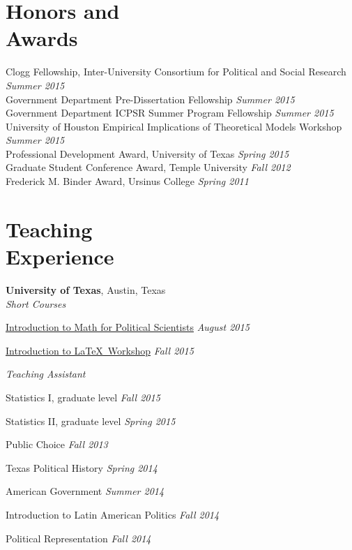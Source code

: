 \documentclass[margin,line]{res}
\newenvironment{list2}{
    \begin{list}{--}{%
        \setlength{\itemsep}{0in}
        \setlength{\parsep}{0in} \setlength{\parskip}{0in}
        \setlength{\topsep}{0in} \setlength{\partopsep}{0in}
        \setlength{\leftmargin}{0.2in}}}{\end{list}}
\begin{document}
\begin{resume}
\section{\sc Honors and \\Awards}
Clogg Fellowship, Inter-University Consortium for Political and Social Research \hfill {\em Summer 2015} \\
Government Department Pre-Dissertation Fellowship   \hfill {\em Summer 2015} \\
Government Department ICPSR Summer Program Fellowship     \hfill    {\em Summer 2015} \\
University of Houston Empirical Implications of Theoretical Models Workshop  \hfill    {\em Summer 2015} \\
Professional Development Award, University of Texas \hfill    {\em Spring 2015} \\
Graduate Student Conference Award, Temple University \hfill    {\em Fall 2012} \\
Frederick M. Binder Award, Ursinus College \hfill    {\em Spring 2011} %

\section{\sc Teaching \\Experience}
\textbf{University of Texas}, Austin, Texas  \\
\emph{Short Courses}
\begin{list2}
	\item
          \href{https://github.com/jabranham/math-camp}{Introduction
            to Math for Political Scientists} \hfill \emph{August
            2015}
        \item
          \href{https://github.com/jabranham/latex-workshop}{Introduction
            to \LaTeX~Workshop} \hfill \emph{Fall 2015}
\end{list2}
\emph{Teaching Assistant} 

\begin{list2}
    \item Statistics I, graduate level \hfill {\em Fall 2015}
	\item Statistics II, graduate level \hfill {\em Spring 2015}
    \item Public Choice \hfill {\em Fall 2013}
    \item Texas Political History \hfill {\em Spring 2014}
    \item American Government \hfill {\em Summer 2014}
    \item Introduction to Latin American Politics \hfill {\em Fall 2014}
    \item Political Representation \hfill {\em Fall 2014}
\end{list2}


\end{resume}
\end{document}
